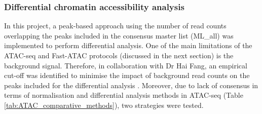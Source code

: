 

\subsubsection{Differential chromatin accessibility analysis}

In this project, a peak-based approach using the number of read counts overlapping the peaks included in the consensus master list (ML\_all) was implemented to perform differential analysis. One of the main limitations of the ATAC-seq and Fast-ATAC protocols (discussed in the next section) is the background signal. Therefore, in collaboration with Dr Hai Fang, an empirical cut-off was identified to minimise the impact of background read counts on the peaks included for the differential analysis \parencite{Xinmin2005,Jonker2014}. Moreover, due to lack of consensus in terms of normalisation and differential analysis methods in ATAC-seq (Table \ref{tab:ATAC_comparative_methods}), two strategies were tested.


